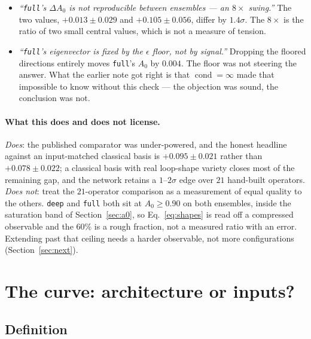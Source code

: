 \documentclass[11pt,a4paper]{article}
\newcommand{\Azero}{A_0}
\newcommand{\dAzero}{\Delta A_0}
\newcommand{\arm}[1]{\texttt{#1}}
\begin{document}
\begin{itemize}
  \item \emph{``\arm{full}'s $\dAzero$ is not reproducible between ensembles ---
        an $8\times$ swing.''} The two values, $+0.013 \pm 0.029$ and
        $+0.105 \pm 0.056$, differ by $1.4\sigma$. The $8\times$ is the ratio of
        two small central values, which is not a measure of tension.
  \item \emph{``\arm{full}'s eigenvector is fixed by the $\epsilon$ floor, not
        by signal.''} Dropping the floored directions entirely moves
        \arm{full}'s $\Azero$ by $0.004$. The floor was not steering the answer.
        What the earlier note got right is that $\operatorname{cond} = \infty$
        made that impossible to know without this check --- the objection was
        sound, the conclusion was not.
\end{itemize}

\paragraph{What this does and does not license.} \emph{Does}: the published
comparator was under-powered, and the honest headline against an input-matched
classical basis is $+0.095 \pm 0.021$ rather than $+0.078 \pm 0.022$; a
classical basis with real loop-shape variety closes most of the remaining gap,
and the network retains a $1$--$2\sigma$ edge over $21$ hand-built operators.
\emph{Does not}: treat the $21$-operator comparison as a measurement of equal
quality to the others. \arm{deep} and \arm{full} both sit at $\Azero \ge 0.90$
on both ensembles, inside the saturation band of Section~\ref{sec:a0}, so
Eq.~\eqref{eq:shapes} is read off a compressed observable and the $60\%$ is a
rough fraction, not a measured ratio with an error. Extending past that ceiling
needs a harder observable, not more configurations (Section~\ref{sec:next}).

\section{The curve: architecture or inputs?}
\label{sec:curve}

\subsection{Definition}
\label{sec:curvedef}
\end{document}
